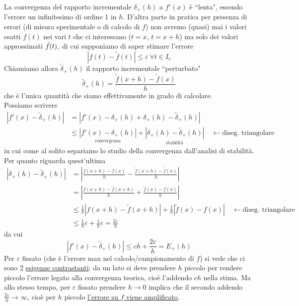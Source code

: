 \documentclass[12pt,a4paper]{article}
\begin{document}
La convergenza del rapporto incrementale $\delta_+(h)$ a $f'(x)$ è ``lenta", essendo l'errore un infinitesimo di ordine 1 in $h$.
\newline
D'altra parte in pratica per presenza di errori (di misura sperimentale o di calcolo di $f$) non avremo (quasi) mai i valori esatti $f(t)$ nei vari $t$ che ci interessano ($t=x$, $t=x+h$) ma solo dei valori approssimati $\Tilde{f}(t)$, di cui supponiamo di saper stimare l'errore
\begin{equation*}
    |f(t) - \tilde{f}(t)| \leq \varepsilon \ \forall t \in I_r
\end{equation*}
Chiamiamo allora $\tilde{\delta}_+(h)$ il rapporto incrementale ``perturbato"
\begin{equation*}
    \tilde{\delta}_+(h) = \frac{\tilde{f}(x+h)-\tilde{f}(x)}{h}
\end{equation*}
che è l'unica quantità che siamo effettivamente in grado di calcolare.\\
Possiamo scrivere
\begin{align*}
    |f'(x)-\tilde{\delta}_+(h)| &= |f'(x)-\delta_+(h)+\delta_+(h)-\tilde{\delta}_+(h)| \\
        & \leq \underset{\text{convergenza}}{|f'(x)-\delta_+(h)|} + \underset{\text{stabilità}}{|\delta_+(h)-\tilde{\delta}_+(h)|} \quad \longleftarrow \text{diseg. triangolare}
\end{align*}
in cui come al solito separiamo lo studio della convergenza dall'analisi di stabilità.\\
Per quanto riguarda quest'ultima
\begin{align*}
    |\delta_+(h)-\tilde{\delta}_+(h)| &= \left | \frac{f(x+h) - f(x)}{h} - \frac{\tilde{f}(x+h) - \tilde{f}(x)}{h}\right| \\
        & = \left | \frac{f(x+h) - \tilde{f}(x+h)}{h} + \frac{\tilde{f}(x) - f(x)}{h}\right | \\
        & \leq \frac{1}{h}\left|f(x+h) - \tilde{f}(x+h)\right| + \frac{1}{h}\left|\tilde{f}(x) - f(x)\right| \quad \longleftarrow \text{diseg. triangolare}\\
        & \leq \frac{1}{h}\varepsilon + \frac{1}{h}\varepsilon = \frac{2\varepsilon}{h}
\end{align*}
da cui 
\begin{equation*}
    \left|f'(x)-\tilde{\delta}_+(h)\right| \leq ch+\frac{2\varepsilon}{h} = E_+(h)
\end{equation*}
Per $\varepsilon$ fissato (che è l'errore max nel calcolo/campionamento di $f$) si vede che ci sono 2 \uline{esigenze
contrastanti}: da un lato si deve prendere $h$ piccolo per rendere piccolo l'errore legato alla convergenza teorica, cioè l'addendo $ch$ nella stima. Ma allo stesso tempo, per $\varepsilon$ fissato prendere $h \rightarrow 0$ implica che il secondo addendo $\frac{2\varepsilon}{h}\rightarrow \infty$, cioè per $h$ piccolo \uline{l'errore su $f$ viene amplificato}.\\
\end{document}
